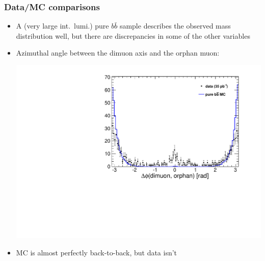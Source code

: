 \documentclass[compress]{beamer}
\begin{document}
\begin{frame}
\frametitle{Data/MC comparisons}

\begin{itemize}
\item A (very large int.\ lumi.) pure $b\bar{b}$ sample describes the
  observed mass distribution well, but there are discrepancies in some
  of the other variables

\item Azimuthal angle between the dimuon axis and the orphan muon:

\begin{center}
\includegraphics[width=0.7\linewidth]{dimuorphan_deltaphi.pdf}
\end{center}

\item MC is almost perfectly back-to-back, but data isn't
\end{itemize}
\end{frame}
\end{document}
